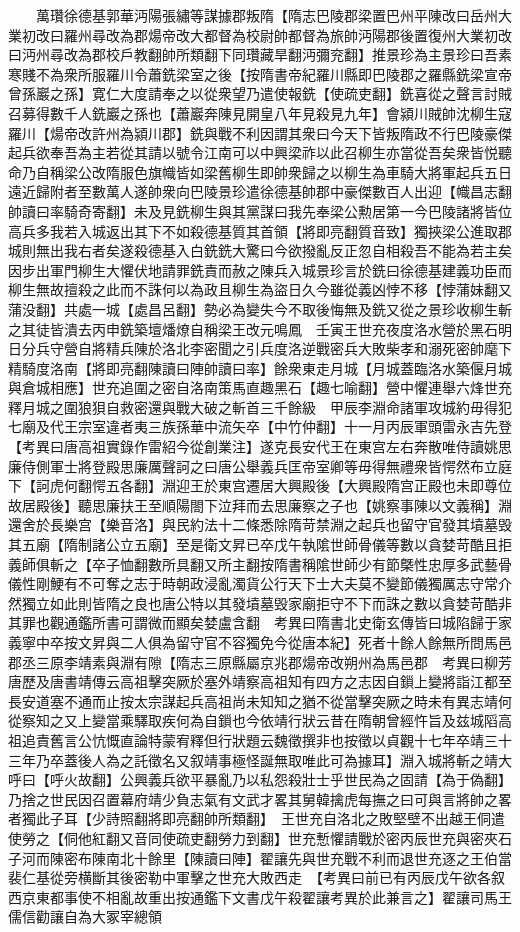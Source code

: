 　　萬瓚徐德基郭華沔陽張繡等謀據郡叛隋【隋志巴陵郡梁置巴州平陳改曰岳州大業初改曰羅州尋改為郡煬帝改大都督為校尉帥都督為旅帥沔陽郡後置復州大業初改曰沔州尋改為郡校戶教翻帥所類翻下同瓚藏旱翻沔彌兖翻】推景珍為主景珍曰吾素寒賤不為衆所服羅川令蕭銑梁室之後【按隋書帝紀羅川縣即巴陵郡之羅縣銑梁宣帝曾孫巖之孫】寛仁大度請奉之以從衆望乃遣使報銑【使疏吏翻】銑喜從之聲言討賊召募得數千人銑巖之孫也【蕭巖奔陳見開皇八年見殺見九年】會潁川賊帥沈柳生寇羅川【煬帝改許州為潁川郡】銑與戰不利因謂其衆曰今天下皆叛隋政不行巴陵豪傑起兵欲奉吾為主若從其請以號令江南可以中興梁祚以此召柳生亦當從吾矣衆皆悦聽命乃自稱梁公改隋服色旗幟皆如梁舊柳生即帥衆歸之以柳生為車騎大將軍起兵五日遠近歸附者至數萬人遂帥衆向巴陵景珍遣徐德基帥郡中豪傑數百人出迎【幟昌志翻帥讀曰率騎奇寄翻】未及見銑柳生與其黨謀曰我先奉梁公勲居第一今巴陵諸將皆位高兵多我若入城返出其下不如殺德基質其首領【將即亮翻質音致】獨挾梁公進取郡城則無出我右者矣遂殺德基入白銑銑大驚曰今欲撥亂反正忽自相殺吾不能為若主矣因步出軍門柳生大懼伏地請罪銑責而赦之陳兵入城景珍言於銑曰徐德基建義功臣而柳生無故擅殺之此而不誅何以為政且柳生為盜日久今雖從義凶悖不移【悖蒲妹翻又蒲没翻】共處一城【處昌呂翻】勢必為變失今不取後悔無及銑又從之景珍收柳生斬之其徒皆潰去丙申銑築壇燔燎自稱梁王改元鳴鳳　壬寅王世充夜度洛水營於黑石明日分兵守營自將精兵陳於洛北李密聞之引兵度洛逆戰密兵大敗柴孝和溺死密帥麾下精騎度洛南【將即亮翻陳讀曰陣帥讀曰率】餘衆東走月城【月城蓋臨洛水築偃月城與倉城相應】世充追圍之密自洛南策馬直趣黑石【趣七喻翻】營中懼連舉六烽世充釋月城之圍狼狽自救密還與戰大破之斬首三千餘級　甲辰李淵命諸軍攻城約毋得犯七廟及代王宗室違者夷三族孫華中流矢卒【中竹仲翻】十一月丙辰軍頭雷永吉先登　【考異曰唐高祖實錄作雷紹今從創業注】遂克長安代王在東宫左右奔散唯侍讀姚思廉侍側軍士將登殿思廉厲聲訶之曰唐公舉義兵匡帝室卿等毋得無禮衆皆愕然布立庭下【訶虎何翻愕五各翻】淵迎王於東宫遷居大興殿後【大興殿隋宫正殿也未即尊位故居殿後】聽思廉扶王至順陽閤下泣拜而去思廉察之子也【姚察事陳以文義稱】淵還舍於長樂宫【樂音洛】與民約法十二條悉除隋苛禁淵之起兵也留守官發其墳墓毁其五廟【隋制諸公立五廟】至是衛文昇已卒戊午執隂世師骨儀等數以貪婪苛酷且拒義師俱斬之【卒子恤翻數所具翻又所主翻按隋書稱隂世師少有節槩性忠厚多武藝骨儀性剛鯁有不可奪之志于時朝政浸亂濁貨公行天下士大夫莫不變節儀獨厲志守常介然獨立如此則皆隋之良也唐公特以其發墳墓毁家廟拒守不下而誅之數以貪婪苛酷非其罪也觀通鑑所書可謂微而顯矣婪盧含翻　考異曰隋書北史衛玄傳皆曰城陷歸于家義寧中卒按文昇與二人俱為留守官不容獨免今從唐本紀】死者十餘人餘無所問馬邑郡丞三原李靖素與淵有隙【隋志三原縣屬京兆郡煬帝改朔州為馬邑郡　考異曰柳芳唐歷及唐書靖傳云高祖擊突厥於塞外靖察高祖知有四方之志因自鎻上變將詣江都至長安道塞不通而止按太宗謀起兵高祖尚未知知之猶不從當擊突厥之時未有異志靖何從察知之又上變當乘驛取疾何為自鎻也今依靖行狀云昔在隋朝曾經忤旨及兹城䧟高祖追責舊言公忼慨直論特蒙宥釋但行狀題云魏徵撰非也按徵以貞觀十七年卒靖三十三年乃卒蓋後人為之託徵名又叙靖事極怪誕無取唯此可為據耳】淵入城將斬之靖大呼曰【呼火故翻】公興義兵欲平暴亂乃以私怨殺壯士乎世民為之固請【為于偽翻】乃捨之世民因召置幕府靖少負志氣有文武才畧其舅韓擒虎每撫之曰可與言將帥之畧者獨此子耳【少詩照翻將即亮翻帥所類翻】　王世充自洛北之敗堅壁不出越王侗遣使勞之【侗他紅翻又音同使疏吏翻勞力到翻】世充慙懼請戰於密丙辰世充與密夾石子河而陳密布陳南北十餘里【陳讀曰陣】翟讓先與世充戰不利而退世充逐之王伯當裴仁基從旁横斷其後密勒中軍擊之世充大敗西走　【考異曰前已有丙辰戊午欲各叙西京東都事使不相亂故重出按通鑑下文書戊午殺翟讓考異於此兼言之】翟讓司馬王儒信勸讓自為大冢宰總領
